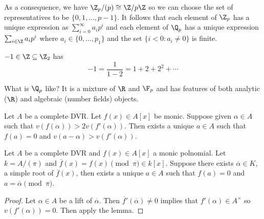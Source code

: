 \documentclass[a4paper]{article}
\begin{document}
As a consequence, we have \(\Z_p/(p) \cong \Z/p\Z\) so we can choose the set of representatives to be \(\{0, 1, \dots, p- 1\}\). It follows that each element of \(\Z_p\) has a unique expression as \(\sum_{i = 0}^\infty a_i p^i\) and each element of \(\Q_p\) has a unique expression \(\sum_{i \in \Z} a_i p^i\) where \(a_i \in \{0, \dots, p_1\}\) and the set \(\{i < 0: a_i \neq 0\}\) is finite.

\begin{eg}
  \(-1 \in \Z \subseteq \Z_2\) has
  \[
    -1 = \frac{1}{1 - 2} = 1 + 2 + 2^2 + \cdots
  \]
\end{eg}

What is \(\Q_p\) like? It is a mixture of \(\R\) and \(\F_p\) and has features of both analytic (\(\R\)) and algebraic (number fields) objects.

\begin{lemma}
  \label{lem:Hensel lemma}
  Let \(A\) be a complete DVR. Let \(f(x) \in A[x]\) be monic. Suppose given \(\alpha \in A\) such that \(v(f(\alpha)) > 2v(f'(\alpha))\). Then exists a unique \(a \in A\) such that \(f(a) = 0\) and \(v(a - \alpha) > v(f'(\alpha))\).
\end{lemma}

\begin{corollary}
  Let \(A\) be a complete DVR and \(f(x) \in A[x]\) a monic polnomial. Let \(k = A/(\pi)\) and \(\overline f(x) = f(x) \pmod \pi \in k[x]\). Suppose there exists \(\overline \alpha \in K\), a simple root of \(\overline f(x)\), then exists a unique \(a \in A\) such that \(f(a) = 0\) and \(a = \overline \alpha \pmod \pi\).
\end{corollary}

\begin{proof}
  Let \(\alpha \in A\) be a lift of \(\overline \alpha\). Then \(\overline f'(\overline \alpha) \neq 0\) implies that \(f'(\alpha) \in A^\times\) so \(v(f'(\alpha)) = 0\). Then apply the lemma.
\end{proof}
\end{document}
